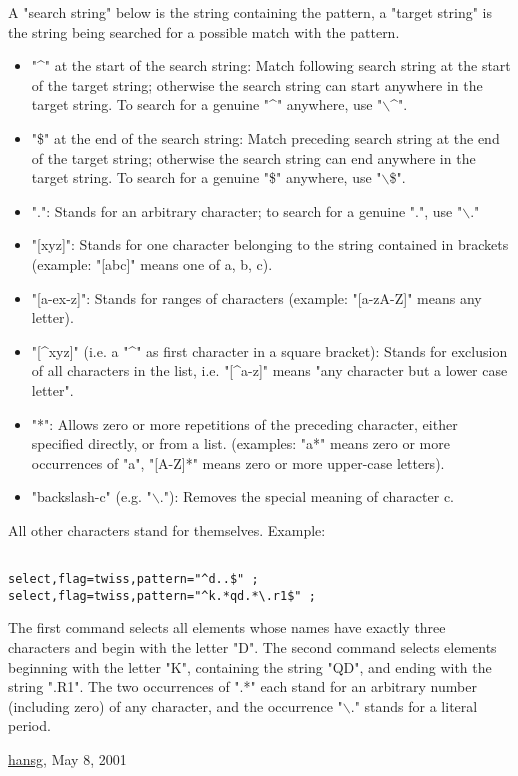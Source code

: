  A "search string" below is the string containing the pattern, a "target string" is the string being searched for a possible match with the pattern. 
\begin{itemize}
	\item "\textasciicircum" at the start of the search string: Match following search string at the start of the target string; otherwise the search string can start anywhere in the target string. To search for a  genuine "\textasciicircum" anywhere, use "$\backslash$\textasciicircum". 
	\item "\$" at the end of the search string: Match preceding search string at the end of the target string; otherwise the search string can end anywhere in the target string. To search for a  genuine "\$" anywhere, use "$\backslash$\$". 
	\item ".": Stands for an arbitrary character; to search for a genuine ".", use "$\backslash$." 
	\item "[xyz]": Stands for one character belonging to the string contained in brackets (example: "[abc]" means one of a, b, c). 
	\item "[a-ex-z]": Stands for ranges of characters (example: "[a-zA-Z]" means any letter). 
	\item "[\textasciicircum xyz]" (i.e. a "\textasciicircum" as first character in a square bracket): Stands for exclusion of all characters in the list, i.e. "[\textasciicircum a-z]" means "any character but a lower case letter". 
	\item "*": Allows zero or more repetitions of the preceding character, either specified directly, or from a list. (examples: "a*" means zero or more occurrences of "a",  "[A-Z]*" means zero or more upper-case letters). 
	\item "backslash-c" (e.g. "$\backslash$."): Removes the special meaning of character c. 
\end{itemize} All other characters stand for themselves. Example: 
\begin{verbatim}

select,flag=twiss,pattern="^d..$" ;
select,flag=twiss,pattern="^k.*qd.*\.r1$" ;
\end{verbatim} The first command selects all elements whose names have exactly three characters and begin with the letter "D". The second command selects elements beginning with the letter "K", containing the string "QD", and ending with the string ".R1". The two occurrences of ".*" each stand for an arbitrary number (including zero) of any character, and the occurrence "$\backslash$." stands for a literal period. 

\href{http://www.cern.ch/Hans.Grote/hansg_sign.html}{hansg}, May 8, 2001 

